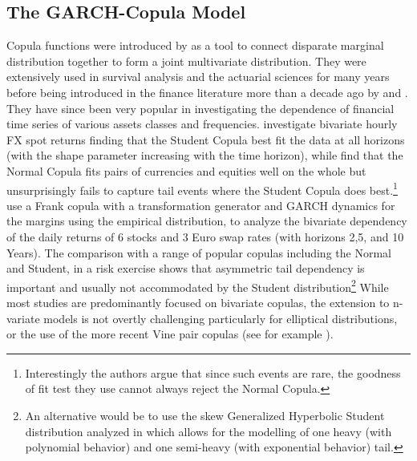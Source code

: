 \subsection{The GARCH-Copula Model}\label{section:cdcc}
Copula functions were introduced by \cite{Sklar1959} as a tool to connect disparate
marginal distribution together to form a joint multivariate distribution. They
were extensively used in survival analysis and the actuarial sciences for many
years before being introduced in the finance literature more than a decade ago
by \cite{Frey2000} and \cite{Li2000}. They have since been very popular in
investigating the dependence of financial time series of various assets classes
and frequencies. \cite{Breymann2003} investigate bivariate hourly FX spot returns
finding that the Student Copula best fit the data at all horizons (with the shape
parameter increasing with the time horizon), while \cite{Malevergne2003} find
that the Normal Copula fits pairs of currencies and equities well on the whole
but unsurprisingly fails to capture tail events where the Student Copula does
best.\footnote{Interestingly the authors argue that since such events are rare,
the goodness of fit test they use cannot always reject the Normal Copula.}
\cite{Junker2005} use a Frank copula with a transformation generator and GARCH
dynamics for the margins using the empirical distribution, to analyze the
bivariate dependency of the daily returns of 6 stocks and 3 Euro swap rates
(with horizons 2,5, and 10 Years). The comparison with a range of popular
copulas including the Normal and Student, in a risk exercise shows that
asymmetric tail dependency is important and usually not accommodated by the
Student distribution\footnote{An alternative would be to use the skew Generalized
Hyperbolic Student distribution analyzed in \cite{Aas2006} which allows
for the modelling of one heavy (with polynomial behavior) and one semi-heavy
(with exponential behavior) tail.} While most studies are predominantly focused
on bivariate copulas, the extension to n-variate models is not overtly
challenging particularly for elliptical distributions, or the use of the more
recent Vine pair copulas (see for example \cite{Joe2010}).
